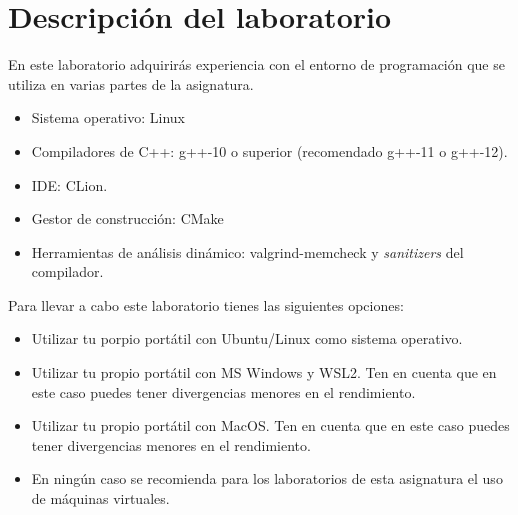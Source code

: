 \section{Descripción del laboratorio}

En este laboratorio adquirirás experiencia con el entorno de programación que se utiliza en varias partes
de la asignatura.

\begin{itemize}
  \item Sistema operativo: Linux
  \item Compiladores de C++: g++-10 o superior (recomendado g++-11 o g++-12).
  \item IDE: CLion.
  \item Gestor de construcción: CMake
  \item Herramientas de análisis dinámico: valgrind-memcheck y \emph{sanitizers} del compilador.
\end{itemize}

Para llevar a cabo este laboratorio tienes las siguientes opciones:
\begin{itemize}
  \item Utilizar tu porpio portátil con Ubuntu/Linux como sistema operativo.
  \item Utilizar tu propio portátil con MS Windows y WSL2. 
        Ten en cuenta que en este caso puedes tener divergencias menores en el rendimiento.
  \item Utilizar tu propio portátil con MacOS.
        Ten en cuenta que en este caso puedes tener divergencias menores en el rendimiento.
  \item En ningún caso se recomienda para los laboratorios de esta asignatura el uso de máquinas virtuales.
\end{itemize}
